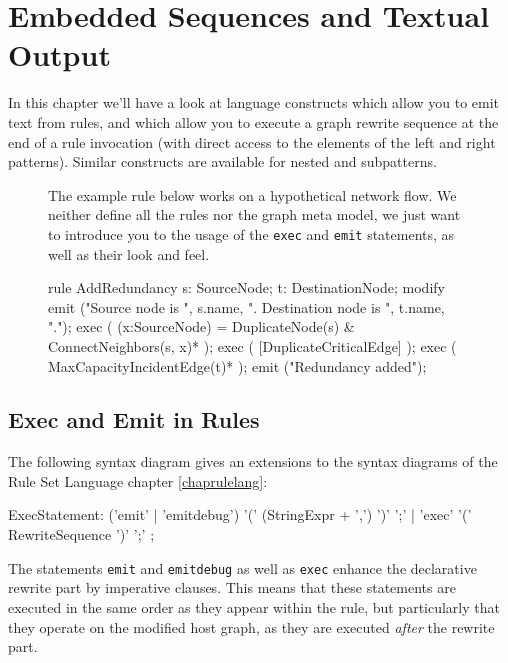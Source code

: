 \chapter{Embedded Sequences and Textual Output}
\label{cha:imperativeandstate}
\label{sct:imperative}

In this chapter we'll have a look at language constructs which allow you to emit text from rules, and which allow you to execute a graph rewrite sequence at the end of a rule invocation (with direct access to the elements of the left and right patterns).
Similar constructs are available for nested and subpatterns.

\begin{figure}[htbp]
\begin{example}
	The example rule below works on a hypothetical network flow.
	We neither define all the rules nor the graph meta model,
	we just want to introduce you to the usage of the \texttt{exec} and \texttt{emit} statements, as well as their look and feel.
	\begin{grgen}
rule AddRedundancy
{
  s: SourceNode;
  t: DestinationNode;
  modify {
    emit ("Source node is ", s.name, ". Destination node is ", t.name, ".");
    exec ( (x:SourceNode) = DuplicateNode(s) & ConnectNeighbors(s, x)* );
    exec ( [DuplicateCriticalEdge] );
    exec ( MaxCapacityIncidentEdge(t)* );
    emit ("Redundancy added");
  }
}
	\end{grgen}
\end{example}
\end{figure}

\section{Exec and Emit in Rules}\label{sct:execemitrules}

The following syntax diagram gives an extensions to the syntax diagrams of the Rule Set Language chapter \ref{chaprulelang}:
\begin{rail}
  ExecStatement: ('emit' | 'emitdebug') '(' (StringExpr + ',') ')' ';' | 'exec' '(' RewriteSequence ')' ';'
	;
\end{rail}

The statements \texttt{emit} and \texttt{emitdebug} as well as \texttt{exec} enhance the declarative rewrite part by imperative clauses.
This means that these statements are executed in the same order as they appear within the rule,
but particularly that they operate on the modified host graph, as they are executed \emph{after} the rewrite part.

